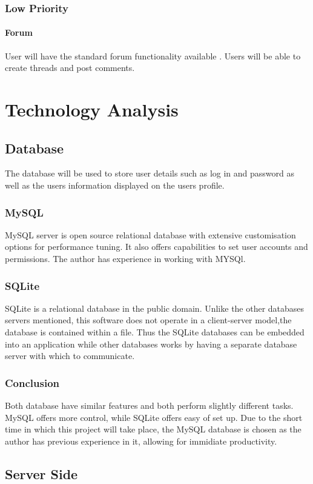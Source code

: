 \documentclass[a4paper,oneside,11pt]{report}
\begin{document}
\subsection{Low Priority}
\subsubsection{Forum}
User will have the standard forum functionality available . Users will be able to create threads and post comments. 
\chapter{Technology Analysis}
\section{Database}
The database will be used to store user details such as log in and password as well as the users information displayed on the users profile.
\subsection{MySQL}
MySQL server is open source relational database with extensive customisation options for performance tuning. It also offers capabilities to set user accounts and permissions. The author has experience in working with MYSQl.
\subsection{SQLite}
SQLite is a relational database in the public domain. Unlike the other databases servers mentioned, this software does not operate in a client-server model,the database is contained within a file. Thus the SQLite databases can be embedded into an application while other databases works by having a separate database server with which to communicate.
\subsection{Conclusion}
Both database have similar features and both perform slightly different tasks. MySQL offers more control, while SQLite offers easy of set up. Due to the short time in which this project will take place, the MySQL database is chosen as the author has previous experience in it, allowing for immidiate productivity.

\section{Server Side} 
\end{document}
